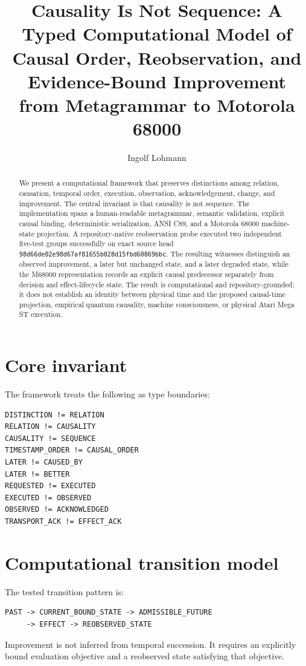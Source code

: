 \documentclass[11pt]{article}
\title{Causality Is Not Sequence: A Typed Computational Model of Causal Order, Reobservation, and Evidence-Bound Improvement from Metagrammar to Motorola 68000}
\author{Ingolf Lohmann}
\date{}
\begin{document}
\maketitle
\begin{abstract}
We present a computational framework that preserves distinctions among relation, causation, temporal order, execution, observation, acknowledgement, change, and improvement. The central invariant is that causality is not sequence. The implementation spans a human-readable metagrammar, semantic validation, explicit causal binding, deterministic serialization, ANSI C89, and a Motorola 68000 machine-state projection. A repository-native reobservation probe executed two independent five-test groups successfully on exact source head \texttt{98d66de02e98d67af81655b028d15fbd60869bbc}. The resulting witnesses distinguish an observed improvement, a later but unchanged state, and a later degraded state, while the M68000 representation records an explicit causal predecessor separately from decision and effect-lifecycle state. The result is computational and repository-grounded; it does not establish an identity between physical time and the proposed causal-time projection, empirical quantum causality, machine consciousness, or physical Atari Mega ST execution.
\end{abstract}

\section{Core invariant}
The framework treats the following as type boundaries:
\begin{verbatim}
DISTINCTION != RELATION
RELATION != CAUSALITY
CAUSALITY != SEQUENCE
TIMESTAMP_ORDER != CAUSAL_ORDER
LATER != CAUSED_BY
LATER != BETTER
REQUESTED != EXECUTED
EXECUTED != OBSERVED
OBSERVED != ACKNOWLEDGED
TRANSPORT_ACK != EFFECT_ACK
\end{verbatim}

\section{Computational transition model}
The tested transition pattern is:
\begin{verbatim}
PAST -> CURRENT_BOUND_STATE -> ADMISSIBLE_FUTURE
     -> EFFECT -> REOBSERVED_STATE
\end{verbatim}
Improvement is not inferred from temporal succession. It requires an explicitly bound evaluation objective and a reobserved state satisfying that objective.
\end{document}
